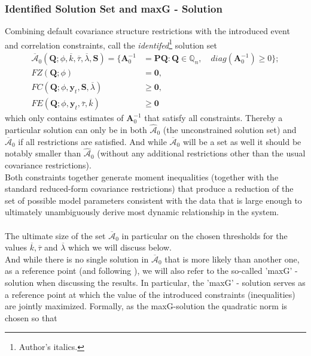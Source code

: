 \documentclass[a4paper,11pt,listof=nochaptergap,oneside,pointednumbers,bibtotoc,bigheadings,liststotoc]{scrbook}
\theoremstyle{mysatz}
\theoremstyle{mydefinition}
\theoremstyle{mybemerkung}
\renewcommand*{\paragraph}[1]{\subsubsection*{#1} \vspace{-3mm}} %
\let\oldhat\hat
\newcommand{\vect}[1]{\boldsymbol{\mathbf{#1}}}
\newcommand{\hatt}[1]{\oldhat{\boldsymbol{\mathbf{#1}}}}
\begin{document}
\paragraph{Identified Solution Set and maxG - Solution}
Combining default covariance structure restrictions with the introduced event and correlation constraints, \citet{ludvigsonetal:18} call the \textit{identifed}\footnote{Author's italics.} solution set 
\begin{equation} \label{eq:svar_ludvi14}
\begin{split}
\overline{\vect{\mathcal{A}}}_0(\vect{Q}; \phi, \overline{k}, \overline{\tau}, \overline{\lambda}, \vect{S})  = \{\vect{A}_0^{-1} & = \vect{P}\vect{Q}: \vect{Q} \in \mathbb{Q}_n, \quad diag(\vect{A}_0^{-1}) \geq 0\}; \\
			FZ(\vect{Q}; \phi) & = \vect{0}, \\
			FC(\vect{Q}; \phi, \vect{y}_t, \vect{S}, \overline{\lambda}) & \geq \vect{0}, \\
			FE(\vect{Q}; \phi, \vect{y}_t, \overline{\tau}, \overline{k}) & \geq \vect{0}
\end{split}								
\end{equation}
which only contains estimates of $\vect{A}_0^{-1}$ that satisfy all constraints. Thereby a particular solution can only be in both $\hatt{\mathcal{A}}_0$ (the unconstrained solution set) and $\overline{\vect{\mathcal{A}}}_0$ if all restrictions are satisfied. And while $\overline{\vect{\mathcal{A}}}_0$ will be a set as well it should be notably smaller than $\hatt{\mathcal{A}}_0$ (without any additional restrictions other than the usual covariance restrictions).
\\
Both constraints together generate moment inequalities (together with the standard reduced-form covariance restrictions) that produce a reduction of the set of possible model parameters consistent with the data that is large enough to ultimately unambiguously derive most dynamic relationship in the system.\\
\\
The ultimate size of the set $\overline{\vect{\mathcal{A}}}_0$ in particular on the chosen thresholds for the values $\overline{k}, \overline{\tau}$ and $\overline{\lambda}$ which we will discuss below.\\
And while there is no single solution in $\overline{\vect{\mathcal{A}}}_0$ that is more likely than another one, as a reference point (and following \citet{ludvigsonetal:18}), we will also refer to the so-called 'maxG' - solution when discussing the results. In particular, the 'maxG' - solution serves as a reference point at which the value of the introduced constraints (inequalities) are jointly maximized. Formally, as the maxG-solution the quadratic norm is chosen so that
\end{document}
